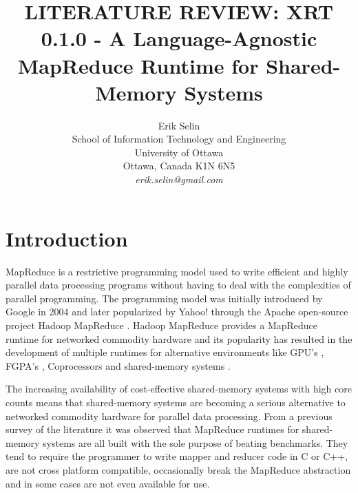 \documentclass[11pt]{article}       %
\begin{document}


\title{LITERATURE REVIEW: XRT 0.1.0 - A Language-Agnostic MapReduce Runtime for
Shared-Memory Systems}


\author{
Erik Selin\\
School of Information Technology and Engineering\\
University of Ottawa\\
Ottawa, Canada K1N 6N5 \\
{\em erik.selin@gmail.com}
} %

\maketitle

\section{Introduction} \label{intro}

MapReduce is a restrictive programming model used to write efficient and highly
parallel data processing programs without having to deal with the complexities
of parallel programming. The programming model was initially introduced by
Google in 2004 \cite{GoogleMapReduce} and later popularized by Yahoo! through
the Apache open-source project Hadoop MapReduce \cite{Hadoop}. Hadoop MapReduce
provides a MapReduce runtime for networked commodity hardware and its
popularity has resulted in the development of multiple runtimes for alternative
environments like GPU’s \cite{Mars}, FGPA's \cite{Melia}, Coprocessors
\cite{MrPhi} and shared-memory systems \cite{Phoenix} \cite{Phoenix++}
\cite{CilkMR} \cite{Metis} \cite{Ostrich}.

The increasing availability of
cost-effective shared-memory systems with high core counts \cite{AWS}
\cite{GoogleCloud} means that shared-memory systems are becoming a serious
alternative to networked commodity hardware for parallel data processing.
From a previous survey of the literature it was observed that MapReduce
runtimes for shared-memory systems are all built with the sole purpose of
beating benchmarks. They tend to require the programmer to write mapper and
reducer code in C or C++, are not cross platform compatible, occasionally break
the MapReduce abstraction and in some cases are not even available for use.
\end{document}
